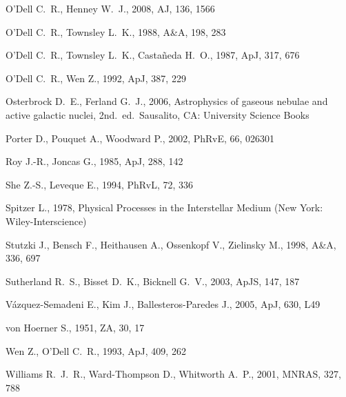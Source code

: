 \documentclass[useAMS,usenatbib]{mn2e}
\begin{document}
\begin{thebibliography}{}
 O'Dell C.~R., Henney W.~J., 2008, AJ, 136, 1566 

 O'Dell C.~R., Townsley L.~K., 1988, A\&A, 198, 283 

 O'Dell C.~R., Townsley
  L.~K., Casta\~neda H.~O., 1987, ApJ, 317, 676 

 O'Dell C.~R., Wen Z., 1992, ApJ, 387, 229 

 Osterbrock D.~E., Ferland
  G.~J., 2006, Astrophysics of gaseous nebulae and active galactic
  nuclei, 2nd.~ed.~Sausalito, CA:
  University Science Books

 Porter D., Pouquet A., Woodward P., 2002, PhRvE, 66, 026301 

 Roy J.-R., Joncas G., 1985, ApJ, 288, 142 

 She Z.-S., Leveque E., 1994, PhRvL, 72, 336 

 Spitzer
  L., 1978, Physical Processes in the Interstellar Medium (New York: Wiley-Interscience)

 Stutzki J., Bensch F., Heithausen A., Ossenkopf V., Zielinsky M., 1998, A\&A, 336, 697 

 Sutherland R.~S., Bisset
  D.~K., Bicknell G.~V., 2003, ApJS, 147, 187 

 V{\'a}zquez-Semadeni E., Kim J., Ballesteros-Paredes J., 2005, ApJ, 630, L49 

von Hoerner S., 1951, ZA, 30, 17 

 Wen Z., O'Dell C.~R., 1993, ApJ, 409, 262 

 Williams R.~J.~R., Ward-Thompson D., Whitworth A.~P., 2001, MNRAS, 327, 788 








\end{thebibliography}
\end{document}
